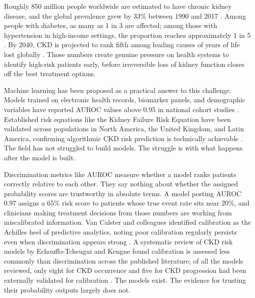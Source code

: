 
Roughly 850 million people worldwide are estimated to have chronic kidney
disease, and the global prevalence grew by 33\% between 1990 and 2017
\citep{Francis2024,KDIGO2024}. Among people with diabetes, as many as 1 in 3 are
affected; among those with hypertension in high-income settings, the proportion
reaches approximately 1 in 5 \citep{Francis2024}. By 2040, CKD is projected to
rank fifth among leading causes of years of life lost globally
\citep{Francis2024}. Those numbers create genuine pressure on health systems to
identify high-risk patients early, before irreversible loss of kidney function
closes off the best treatment options.

Machine learning has been proposed as a practical answer to this challenge.
Models trained on electronic health records, biomarker panels, and demographic
variables have reported AUROC values above 0.95 in national cohort studies
\citep{Krishnamurthy2021, Bai2022, Li2025, Sabanayagam2025}. Established risk
equations like the Kidney Failure Risk Equation have been validated across
populations in North America, the United Kingdom, and Latin America, confirming
algorithmic CKD risk prediction is technically achievable
\citep{Tangri2016, Major2019, BravoZuniga2025}. The field has not struggled to
build models. The struggle is with what happens after the model is built.

Discrimination metrics like AUROC measure whether a model ranks patients
correctly relative to each other. They say nothing about whether the assigned
probability scores are trustworthy in absolute terms. A model posting AUROC 0.97
assigns a 65\% risk score to patients whose true event rate sits near 20\%, and
clinicians making treatment decisions from those numbers are working from
miscalibrated information. Van Calster and colleagues identified calibration as
the Achilles heel of predictive analytics, noting poor calibration regularly
persists even when discrimination appears strong \citep{VanCalster2019}. A
systematic review of CKD risk models by Echouffo-Tcheugui and Kengne found
calibration is assessed less commonly than discrimination across the published
literature; of all the models reviewed, only eight for CKD occurrence and five
for CKD progression had been externally validated for calibration
\citep{EchouffoTcheugui2012}. The models exist. The evidence for trusting their
probability outputs largely does not.

